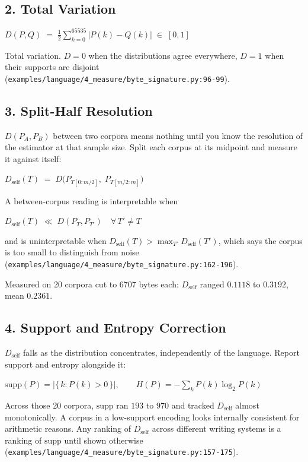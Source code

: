 \subsection{2. Total Variation}

\(D(P,Q) \;=\; \tfrac{1}{2} \sum_{k=0}^{65535} \bigl| P(k) - Q(k) \bigr| \;\in\; [0,1]\)

Total variation. \(D=0\) when the distributions agree everywhere, \(D=1\) when their supports are disjoint (\texttt{examples/\allowbreak{}language/\allowbreak{}4\_\allowbreak{}measure/\allowbreak{}byte\_\allowbreak{}signature.\allowbreak{}py:96-\allowbreak{}99}).

\subsection{3. Split-Half Resolution}

\(D(P_A,P_B)\) between two corpora means nothing until you know the resolution of the estimator at that sample size. Split each corpus at its midpoint and measure it against itself:

\(D_{\text{self}}(T) \;=\; D\bigl(P_{T[0:m/2]},\; P_{T[m/2:m]}\bigr)\)

A between-corpus reading is interpretable when

\(D_{\text{self}}(T) \;\ll\; D(P_T, P_{T'}) \quad \forall\, T' \neq T\)

and is uninterpretable when \(D_{\text{self}}(T) > \max_{T'} D_{\text{self}}(T')\), which says the corpus is too small to distinguish from noise (\texttt{examples/\allowbreak{}language/\allowbreak{}4\_\allowbreak{}measure/\allowbreak{}byte\_\allowbreak{}signature.\allowbreak{}py:162-\allowbreak{}196}).

Measured on 20 corpora cut to 6707 bytes each: \(D_{\text{self}}\) ranged \(0.1118\) to \(0.3192\), mean \(0.2361\).

\subsection{4. Support and Entropy Correction}

\(D_{\text{self}}\) falls as the distribution concentrates, independently of the language. Report support and entropy alongside it:

\(\mathrm{supp}(P) = \bigl|\{\,k : P(k) > 0\,\}\bigr|, \qquad H(P) = -\sum_{k} P(k)\log_2 P(k)\)

Across those 20 corpora, \(\mathrm{supp}\) ran \(193\) to \(970\) and tracked \(D_{\text{self}}\) almost monotonically. A corpus in a low-support encoding looks internally consistent for arithmetic reasons. Any ranking of \(D_{\text{self}}\) across different writing systems is a ranking of \(\mathrm{supp}\) until shown otherwise (\texttt{examples/\allowbreak{}language/\allowbreak{}4\_\allowbreak{}measure/\allowbreak{}byte\_\allowbreak{}signature.\allowbreak{}py:157-\allowbreak{}175}).


